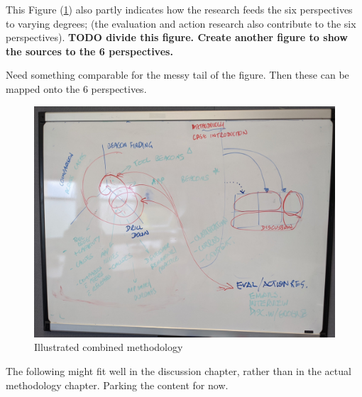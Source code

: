 This Figure (\ref{fig:illustrated-combined-methodology}) also partly indicates how the research feeds the six perspectives to varying degrees; (the evaluation and action research also contribute to the six perspectives). 
\textbf{TODO divide this figure. Create another figure to show the sources to the 6 perspectives.}

Need something comparable for the messy tail of the figure. Then these can be mapped onto the 6 perspectives. 

\begin{figure}
    \centering
    \includegraphics[width=14cm]{images/my/illustrated-combined-methodology-v0-1.jpg}
    \caption{Illustrated combined methodology}
    \label{fig:illustrated-combined-methodology}
\end{figure}



The following might fit well in the discussion chapter, rather than in the actual methodology chapter. Parking the content for now.

